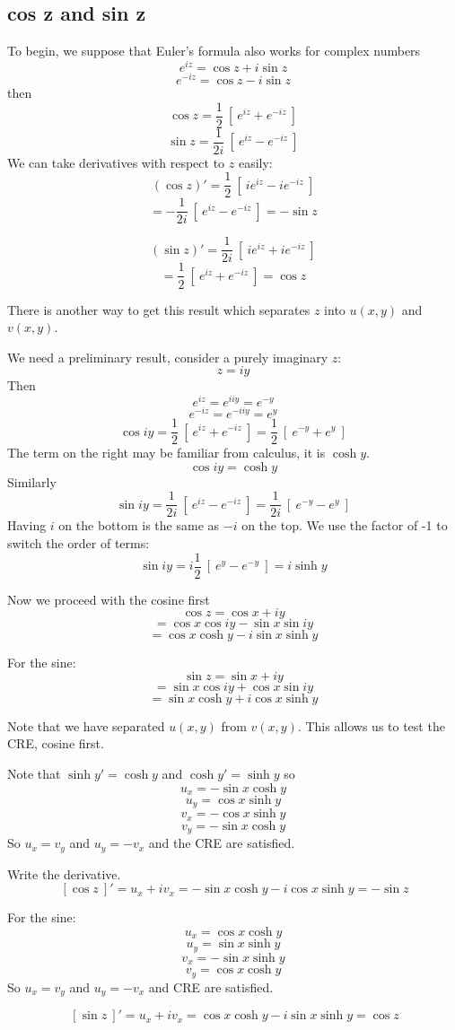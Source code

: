 \documentclass[11pt, oneside]{article}
\begin{document}
\subsection*{cos z and sin z}
To begin, we suppose that Euler's formula also works for complex numbers
\[ e^{iz} = \cos z + i \sin z \]
\[ e^{-iz} = \cos z - i \sin z \]
then
\[ \cos z = \frac{1}{2} \ [ \ e^{iz} + e^{-iz} \ ] \] 
\[ \sin z = \frac{1}{2i} \ [ \ e^{iz} - e^{-iz} \ ] \] 
We can take derivatives with respect to $z$ easily:
\[ (\cos z)' = \frac{1}{2} \ [ \ i e^{iz} - i e^{-iz} \ ] \] 
\[ = - \frac{1}{2i} \ [ \ e^{iz} - e^{-iz} \ ] = - \sin z \] 

\[ (\sin z)' = \frac{1}{2i} \ [ \ ie^{iz} + ie^{-iz} \ ] \] 
\[ = \frac{1}{2} \ [ \ e^{iz} + e^{-iz} \ ] = \cos z \] 

There is another way to get this result which separates $z$ into $u(x,y)$ and $v(x,y)$.

We need a preliminary result, consider a purely imaginary $z$:
\[ z = iy \]
Then
\[ e^{iz} = e^{iiy} = e^{-y}  \]
\[ e^{-iz} = e^{-iiy} = e^{y} \]
\[ \cos iy = \frac{1}{2} \ [ \ e^{iz} + e^{-iz} \ ] = \frac{1}{2} \ [ \ e^{-y} + e^{y} \ ] \]
The term on the right may be familiar from calculus, it is $\cosh y$.
\[ \cos iy = \cosh y \]
Similarly
\[ \sin iy = \frac{1}{2i} \ [ \ e^{iz} - e^{-iz} \ ] = \frac{1}{2i} \ [ \ e^{-y} - e^{y} \ ] \]
Having $i$ on the bottom is the same as $-i$ on the top.  We use the factor of -1 to switch the order of terms:
\[ \sin iy = i \frac{1}{2} \ [ \ e^{y} - e^{-y} \ ]  = i \sinh y \]

Now we proceed with the cosine first
\[ \cos z = \cos x + iy \]
\[ = \cos x \cos iy - \sin x \sin iy \]
\[ = \cos x \cosh y - i \sin x \sinh y \]

For the sine:
\[ \sin z = \sin x + iy \]
\[ = \sin x \cos iy + \cos x \sin iy \]
\[ = \sin x \cosh y + i \cos x \sinh y \]

Note that we have separated $u(x,y)$ from $v(x,y)$.  This allows us to test the CRE, cosine first.

Note that $\sinh y' = \cosh y$ and $\cosh y' = \sinh y$ so
\[ u_x = -\sin x \cosh y \]
\[ u_y = \cos x \sinh y \]
\[ v_x = - \cos x \sinh y \]
\[ v_y = - \sin x \cosh y \]
So $u_x = v_y$ and $u_y = -v_x$ and the CRE are satisfied.

Write the derivative.
\[ \ [ \cos z \ ]' = u_x + i v_x = - \sin x \cosh y - i \cos x \sinh y = - \sin z   \]

For the sine:
\[ u_x = \cos x \cosh y \]
\[ u_y = \sin x \sinh y \]
\[ v_x = - \sin x \sinh y \]
\[ v_y = \cos x \cosh y \]
So $u_x = v_y$ and $u_y = -v_x$ and CRE are satisfied.

\[ \ [ \sin z \ ]' = u_x + i v_x = \cos x \cosh y - i \sin x \sinh y = \cos z  \]
\end{document}
